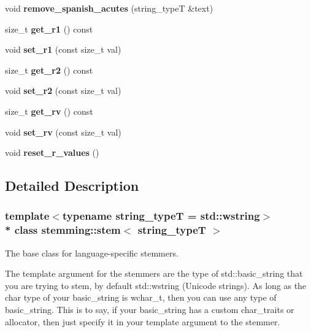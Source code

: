 \begin{DoxyCompactItemize}
\item 
void {\bfseries remove\+\_\+spanish\+\_\+acutes} (string\+\_\+typeT \&text)\label{classstemming_1_1stem_a0b3535733088736897f35f8d925c92e9}

\item 
size\+\_\+t {\bfseries get\+\_\+r1} () const \label{classstemming_1_1stem_a09ab497dfe31fc007c70d7f7d790fa51}

\item 
void {\bfseries set\+\_\+r1} (const size\+\_\+t val)\label{classstemming_1_1stem_a87fa173343063b5e85722edefe493ab5}

\item 
size\+\_\+t {\bfseries get\+\_\+r2} () const \label{classstemming_1_1stem_a90aba2c99e1fa12883eba32211089f3b}

\item 
void {\bfseries set\+\_\+r2} (const size\+\_\+t val)\label{classstemming_1_1stem_a032bb774988c5b8f6fae7cf28b59d485}

\item 
size\+\_\+t {\bfseries get\+\_\+rv} () const \label{classstemming_1_1stem_aefa75f006e0b4b623a2608dc23dff605}

\item 
void {\bfseries set\+\_\+rv} (const size\+\_\+t val)\label{classstemming_1_1stem_a1fda692e873dfcae7048679ffdb29a5e}

\item 
void {\bfseries reset\+\_\+r\+\_\+values} ()\label{classstemming_1_1stem_acefba08458c6a8cc00a733afb3a064ed}

\end{DoxyCompactItemize}


\subsection{Detailed Description}
\subsubsection*{template$<$typename string\+\_\+typeT = std\+::wstring$>$\\*
class stemming\+::stem$<$ string\+\_\+type\+T $>$}

The base class for language-\/specific stemmers. 

The template argument for the stemmers are the type of std\+::basic\+\_\+string that you are trying to stem, by default std\+::wstring (Unicode strings). As long as the char type of your basic\+\_\+string is wchar\+\_\+t, then you can use any type of basic\+\_\+string. This is to say, if your basic\+\_\+string has a custom char\+\_\+traits or allocator, then just specify it in your template argument to the stemmer.

